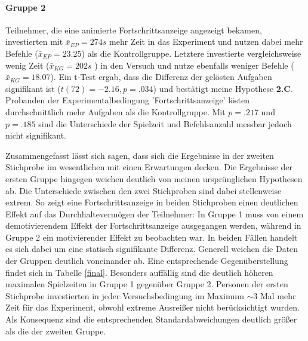 \paragraph{Gruppe 2}
Teilnehmer, die eine animierte Fortschrittsanzeige angezeigt bekamen, investierten mit $\bar{x}_{EP}=274 s$ mehr Zeit in das Experiment
 und nutzen dabei mehr Befehle ($\bar{x}_{EP}=23.25$) als die Kontrollgruppe. Letztere investierte vergleichsweise wenig Zeit ($ \bar{x}_{KG} = 202s $ ) in den Versuch und nutze ebenfalls weniger Befehle ($ \bar{x}_{KG} = 18.07 $). Ein t-Test ergab, dass die Differenz der gelösten Aufgaben signifikant ist ($t(72)=-2.16, p=.034$) und bestätigt meine Hypothese \textbf{2.C}.  Probanden der Experimentalbedingung 'Fortschrittsanzeige' lösten durchschnittlich mehr Aufgaben als die Kontrollgruppe. Mit $ p=.217 $ und $p=.185$ sind die Unterschiede der Spielzeit und Befehlsanzahl messbar jedoch nicht signifikant.
 

Zusammengefasst lässt sich sagen, dass sich die Ergebnisse in der zweiten Stichprobe im wesentlichen mit einen Erwartungen decken. Die Ergebnisse der ersten Gruppe hingegen weichen deutlich von meinen ursprünglichen Hypothesen ab. Die Unterschiede zwischen den zwei Stichproben sind dabei stellenweise extrem. So zeigt eine Fortschrittsanzeige in beiden Stichproben einen deutlichen Effekt auf das Durchhaltevermögen der Teilnehmer: In Gruppe 1 muss von einem demotivierendem Effekt der Fortschrittsanzeige ausgegangen werden, während in Gruppe 2 ein motivierender Effekt zu beobachten war. In beiden Fällen handelt es sich dabei um eine statisch signifikante Differenz. Generell weichen die Daten der Gruppen deutlich voneinander ab. Eine entsprechende Gegenüberstellung findet sich in Tabelle \ref{final}. Besonders auffällig sind die deutlich höheren maximalen Spielzeiten in Gruppe 1 gegenüber Gruppe 2. Personen der ersten Stichprobe investierten in jeder Versuchsbedingung im Maximum $\sim3$ Mal mehr Zeit für das Experiment, obwohl extreme Ausreißer nicht berücksichtigt wurden. Als Konsequenz sind die entsprechenden Standardabweichungen deutlich größer als die der zweiten Gruppe.


